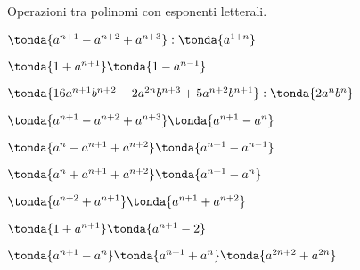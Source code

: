 \begin{esercizio}[*]
\label{ese:10.35}
Operazioni tra polinomi con esponenti letterali.

\begin{enumeratea}
\spazielenx
\item \(\tonda{a^{n+1}-a^{n+2}+a^{n+3}}:\tonda{a^{1+n}}\)
\item \(\tonda{1+a^{n+1}}\tonda{1-a^{n-1}}\)
\item \(\tonda{16a^{n+1}b^{n+2}-2a^{2n}b^{n+3}+5a^{n+2}b^{n+1}}:
      \tonda{2a^{n}b^{n}}\)
\item \(\tonda{a^{n+1}-a^{n+2}+a^{n+3}}\tonda{a^{n+1}-a^{n}}\)
\item \(\tonda{a^{n}-a^{n+1}+a^{n+2}}\tonda{a^{n+1}-a^{n-1}}\)
\item \(\tonda{a^{n}+a^{n+1}+a^{n+2}}\tonda{a^{n+1}-a^{n}}\)
\item \(\tonda{a^{n+2}+a^{n+1}}\tonda{a^{n+1}+a^{n+2}}\)
\item \(\tonda{1+a^{n+1}}\tonda{a^{n+1}-2}\)
\item \(\tonda{a^{n+1}-a^{n}}\tonda{a^{n+1}+a^{n}}
      \tonda{a^{2n+2}+a^{2n}}\)
\end{enumeratea}
\end{esercizio}


